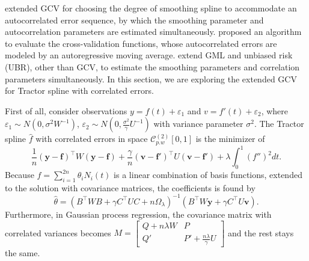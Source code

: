 \cite{diggle1989spline} extended GCV for choosing the degree of smoothing spline to accommodate an autocorrelated error sequence, by which the smoothing parameter and autocorrelation parameters are estimated simultaneously.  \cite{kohn1992nonparametric} proposed an algorithm to evaluate the cross-validation functions, whose autocorrelated errors are modeled by an autoregressive moving average. \cite{wang1998smoothing} extend GML and unbiased risk (UBR), other than GCV, to estimate the smoothing parameters and correlation parameters simultaneously. In this section, we are exploring the extended GCV for Tractor spline with correlated errors. 


First of all, consider observations $y=f(t)+\varepsilon_1$ and $v=f'(t)+\varepsilon_2$, where $\varepsilon_1\sim N\left(0,\sigma^2W^{-1}\right)$, $\varepsilon_2\sim N\left(0,\frac{\sigma^2}{\gamma}U^{-1}\right)$ with variance parameter $\sigma^2$. The Tractor spline $\hat{f}$ with correlated errors in space $\mathcal{C}_{p.w}^{(2)}[0,1]$ is the minimizer of 
\begin{equation}
\frac{1}{n}\left(\mathbf{y}-\mathbf{f}\right)^\top W\left(\mathbf{y}-\mathbf{f}\right)+\frac{\gamma}{n}\left(\mathbf{v}-\mathbf{f}'\right)^\top U\left(\mathbf{v}-\mathbf{f}'\right)+\lambda\int_0^1\left(f''\right)^2dt.
\end{equation}
Because $f=\sum_{i=1}^{2n}\theta_iN_i\left(t\right)$ is a linear combination of basis functions, extended to the solution with covariance matrices, the coefficients is found by 
\begin{equation}
\hat{\theta}=\left(B^\top W B+ \gamma C^\top UC+n\Omega_\lambda\right)^{-1}\left(B^\top W \mathbf{y}+\gamma C^\top U\mathbf{v}\right).
\end{equation}
Furthermore, in Gaussian process regression, the covariance matrix with correlated variances becomes 
$M=\begin{bmatrix}
Q+n\lambda W& P\\
Q'& P'+\frac{n\lambda}{\gamma}U
\end{bmatrix}$ and the rest stays the same. 


